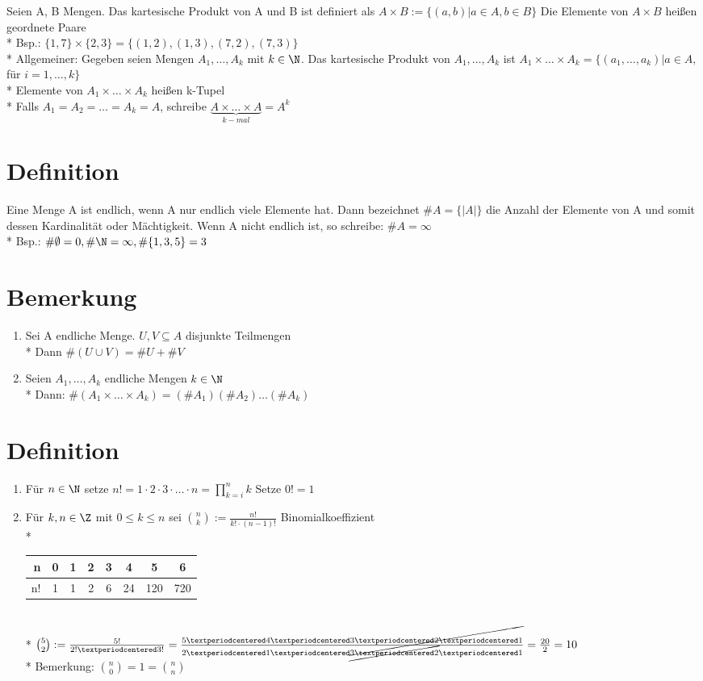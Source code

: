 Seien A, B Mengen. Das kartesische Produkt von A und B ist definiert als $A × B := \{(a,b)|a\in A, b \in B\}$ Die Elemente von $A × B$ heißen geordnete Paare\\*
Bsp.: $\{1,7\}\times \{2,3\}=\{(1,2),(1,3),(7,2),(7,3)\}$\\*
Allgemeiner: Gegeben seien Mengen
$A_1,…,A_k$ mit $k \in \N$. Das kartesische Produkt von $A_1,…,A_k$ ist $A_1\times …\times A_k = \{(a_1,…,a_k)|a\in A, $für $i=1,…,k\}$\\*
Elemente von $A_1 × … × A_k$ heißen k-Tupel\\*
Falls $A_1=A_2=…=A_k=A$, schreibe $\underbrace{A\times…\times A}_{k-mal}=A^k$

\section{Definition}
Eine Menge A ist endlich, wenn A nur endlich viele Elemente hat. Dann bezeichnet
$\#A = \{|A|\}$ die Anzahl der Elemente von A und somit dessen Kardinalit\"at
oder M\"achtigkeit. Wenn A nicht endlich ist, so schreibe: $\# A= \infty$\\*
Bsp.: $\#\emptyset = 0, \#\N=\infty, \# \{1,3,5\} = 3$

\section{Bemerkung}
\begin{enumerate}
\item Sei A endliche Menge. $U,V\subseteq A$ disjunkte Teilmengen\\*
Dann $\#(U\cup V)=\# U + \# V$ 
\item Seien $A_1,…,A_k$ endliche Mengen $k \in \N$\\*
Dann: $\#(A_1 \times … \times A_k)=(\#A_1)(\#A_2)…(\#A_k)$
\end{enumerate}

\section{Definition}
\begin{enumerate}
\item Für $n\in \N$ setze $n!=1·2·3· … · n=\prod_{k=i}^n k$
Setze $0!=1$
\item Für $k,n\in \Z$ mit $0\le k \le n$ sei $\binom{n}{k}:= \frac{n!}{k!·(n-1)!}$ \Rarr{} Binomialkoeffizient\\*
\begin{tabular}{r|c|c|c|c|c|c|c}
n & 0 & 1 & 2 & 3 & 4 & 5 & 6\\* \hline
n! & 1 & 1 & 2 & 6 & 24 & 120 & 720
\end{tabular}\\*
\bsp
$\binom{5}{2} := \frac{5!}{2!· 3!} = \frac{5· 4 ·\cancel{3 · 2 · 1}}{2· 1· \cancel{3· 2}· 1 } = \frac{20}{2}=10$\\*
Bemerkung: $\binom{n}{0}= 1 = \binom{n}{n}$
\end{enumerate}